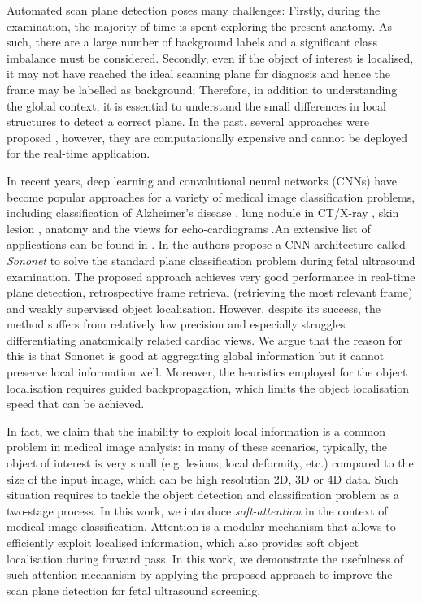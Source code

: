 \documentclass{article}
\begin{document}
Automated scan plane detection poses many challenges: Firstly, during the examination, the majority of time is spent exploring the present anatomy. As such, there are a large number of background labels and a significant class imbalance must be considered. Secondly, even if the object of interest is localised, it may not have reached the ideal scanning plane for diagnosis and hence the frame may be labelled as background; Therefore, in addition to understanding the global context, it is essential to understand the small differences in local structures to detect a correct plane. In the past, several approaches were proposed \cite{yaqub2015guided, chen2015automatic}, however, they are computationally expensive and cannot be deployed for the real-time application. 

In recent years, deep learning and convolutional neural networks (CNNs) have become popular approaches for a variety of medical image classification problems, including classification of Alzheimer's disease \cite{Sarraf070441}, lung nodule in CT/X-ray \cite{DBLP:journals/corr/abs-1801-09555}, skin lesion  \cite{esteva2017dermatologist, kawahara2016multi}, anatomy \cite{roth2015anatomy} and the views for echo-cardiograms \cite{madani2018fast}.An extensive list of applications can be found in \cite{DBLP:journals/corr/LitjensKBSCGLGS17,zaharchuk2018deep}. In \cite{baumgartner2016real} the authors propose a CNN architecture called \emph{Sononet} to solve the standard plane classification problem during fetal ultrasound examination. The proposed approach achieves very good performance in real-time plane detection, retrospective frame retrieval (retrieving the most relevant frame) and weakly supervised object localisation. However, despite its success, the method suffers from relatively low precision and especially struggles differentiating anatomically related cardiac views. We argue that the reason for this is that Sononet is good at aggregating global information but it cannot preserve local information well. Moreover, the heuristics employed for the object localisation requires guided backpropagation, which limits the object localisation speed that can be achieved.  

In fact, we claim that the inability to exploit local information is a common problem in medical image analysis: in many of these scenarios, typically, the object of interest is very small (e.g. lesions, local deformity, etc.) compared to the size of the input image, which can be high resolution 2D, 3D or 4D data. Such situation requires to tackle the object detection and classification problem as a two-stage process. In this work, we introduce \emph{soft-attention} in the context of medical image classification. Attention is a modular mechanism that allows to efficiently exploit localised information, which also provides soft object localisation during forward pass. In this work, we demonstrate the usefulness of such attention mechanism by applying the proposed approach to improve the scan plane detection for fetal ultrasound screening. 
\end{document}
